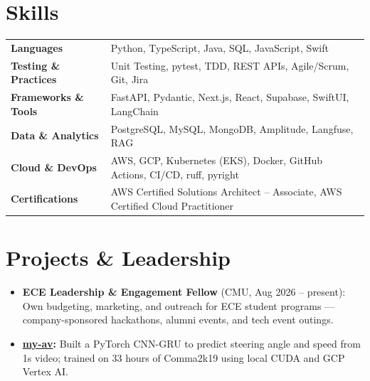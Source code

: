\documentclass[11pt, letterpaper]{article}
\begin{document}
\section{Skills}
\begin{tabularx}{\textwidth}{@{}l @{\hspace{7pt}} >{\raggedright\arraybackslash}X@{}}
  \textbf{Languages} & Python, TypeScript, Java, SQL, JavaScript, Swift \\[1pt]
  \textbf{Testing \& Practices} & Unit Testing, pytest, TDD, REST APIs, Agile/Scrum, Git, Jira \\[1pt]
  \textbf{Frameworks \& Tools} & FastAPI, Pydantic, Next.js, React, Supabase, SwiftUI, LangChain \\[1pt]
  \textbf{Data \& Analytics} & PostgreSQL, MySQL, MongoDB, Amplitude, Langfuse, RAG \\[1pt]
  \textbf{Cloud \& DevOps} & AWS, GCP, Kubernetes (EKS), Docker, GitHub Actions, CI/CD, ruff, pyright \\[1pt]
  \textbf{Certifications} & AWS Certified Solutions Architect -- Associate, AWS Certified Cloud Practitioner \\
\end{tabularx}

\section{Projects \& Leadership}
\begin{itemize}
  \item \textbf{ECE Leadership \& Engagement Fellow} (CMU, Aug 2026 -- present): Own budgeting, marketing, and outreach for ECE student programs --- company-sponsored hackathons, alumni events, and tech event outings.
  \item \textbf{\href{https://github.com/lordphone/my-av}{my-av}:} Built a PyTorch CNN-GRU to predict steering angle and speed from 1s video; trained on 33 hours of Comma2k19 using local CUDA and GCP Vertex AI.
\end{itemize}
\end{document}
